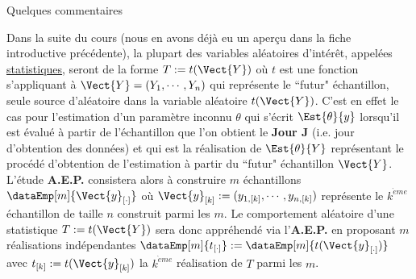 \documentclass[10pt]{report}
\begin{document}
\begin{IndicList}{Quelques commentaires}
\item Dans la suite du cours (nous en avons déjà eu un aperçu dans la fiche introductive précédente), la plupart des variables aléatoires d'intérêt, appelées \underline{statistiques}, seront de la forme $T:=t(\Vect{Y})$ où $t$ est une fonction s'appliquant à $\Vect{Y}=(Y_1,\cdots,Y_n)$ qui représente le ``futur" échantillon, seule source d'aléatoire dans la variable aléatoire $t(\Vect{Y})$. C'est en effet le cas pour  l'estimation d'un paramètre inconnu $\theta$ qui s'écrit $\Est{\theta}{y}$ lorsqu'il est évalué à partir de l'échantillon que l'on obtient le \textbf{Jour J} (i.e. jour d'obtention des données) et qui est la réalisation de $\Est{\theta}{Y}$ représentant le procédé d'obtention de l'estimation à partir du ``futur" échantillon $\Vect{Y}$. L'étude \textbf{A.E.P.} consistera alors à construire $m$ échantillons $\dataEmp[m]{\Vect{y}_{[\cdot]}}$ où $\Vect{y}_{[k]}:=(y_{1,[k]},\cdots,y_{n,[k]})$ représente le $k^{\grave eme}$ échantillon de taille $n$ construit parmi les $m$. Le comportement aléatoire d'une statistique $T:=t(\Vect{Y})$ sera donc appréhendé via  l'\textbf{A.E.P.} en proposant $m$ réalisations indépendantes $\dataEmp[m]{t_{[\cdot]}}:=\dataEmp[m]{t(\Vect{y}_{[\cdot]})}$ avec $t_{[k]}:=t(\Vect{y}_{[k]})$ la $k^{\grave eme}$ réalisation de $T$ parmi les $m$.
\end{IndicList}
\end{document}
